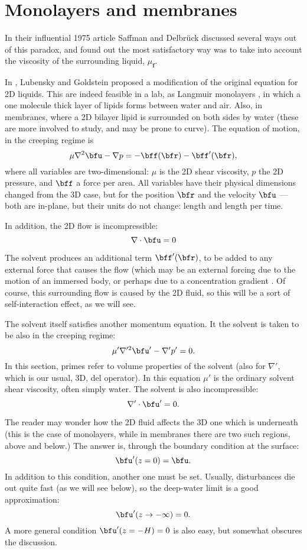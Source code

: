 \section{Monolayers and membranes}

In their influential 1975 article Saffman and Delbr{\"u}ck
\cite{saffman1975brownian} discussed several ways out of this paradox,
and found out the most satisfactory way was to take into account the
viscosity of the surrounding liquid, $ \mu_\mathbf{f}$.

In \cite{lubensky1996hydrodynamics}, Lubensky and Goldstein proposed a
modification of the original equation for 2D liquids. This are indeed
feasible in a lab, as Langmuir monolayers ,
in which a one molecule thick layer of lipids forms between water and
air. Also, in membranes, where a 2D bilayer lipid is surrounded on
both sides by water (these are more involved to study, and may be
prone to curve). The equation of motion, in the creeping regime is
\begin{equation}
  \label{eq:Stokes_2D}
  \mu \nabla^2 \bfu - \nabla p = -\bff(\bfr) -\bff'(\bfr) ,
\end{equation}
%
where all variables are two-dimensional: $\mu$ is the 2D shear
viscosity, $p$ the 2D pressure, and $\bff$ a force per area. All
variables have their physical dimensions changed from the 3D case, but
for the position $\bfr$ and the velocity $\bfu$ --- both are in-plane,
but their units do not change: length and length per time.

In addition, the 2D flow is incompressible:
\[
  \nabla\cdot \bfu = 0
\]

The solvent produces an additional term $\bff'(\bfr) $, to be added to
any external force that causes the flow (which may be an external
forcing due to the motion of an immersed body, or perhaps due to a
concentration gradient \cite{duque2018}. Of course, this surrounding
flow is caused by the 2D fluid, so this will be a sort of
self-interaction effect, as we will see.

The solvent itself satisfies another momentum equation. It the solvent
is taken to be also in the creeping regime:
\[
  \mu' \nabla'^2 \bfu' -\nabla' p' = 0 .
\]
In this section, primes refer to volume properties of the solvent
(also for $\nabla'$, which is our usual, 3D, del operator). In this
equation $\mu'$ is the ordinary solvent shear viscosity, often simply
water.  The solvent is also incompressible:
\[
  \nabla'\cdot \bfu' = 0 .
\]

The reader may wonder how the 2D fluid affects the 3D one which is
underneath (this is the case of monolayers, while in membranes there
are two such regions, above and below.) The answer is, through the
boundary condition at the surface:
\[
  \bfu'(z=0) = \bfu .
\]
In addition to this condition, another one must be set. Usually,
disturbances die out quite fast (as we will see below), so the
deep-water limit is a good approximation:
\[
  \bfu'(z \to -\infty ) = 0 .
\]
A more general condition $\bfu'(z = -H ) = 0$ is also easy, but
somewhat obscures the discussion.

